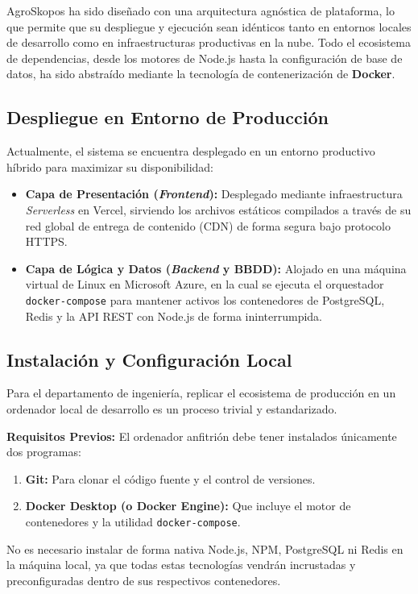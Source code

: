 AgroSkopos ha sido diseñado con una arquitectura agnóstica de plataforma, lo que permite que su despliegue y ejecución sean idénticos tanto en entornos locales de desarrollo como en infraestructuras productivas en la nube. Todo el ecosistema de dependencias, desde los motores de Node.js hasta la configuración de base de datos, ha sido abstraído mediante la tecnología de contenerización de \textbf{Docker}.

\subsection{Despliegue en Entorno de Producción}
Actualmente, el sistema se encuentra desplegado en un entorno productivo híbrido para maximizar su disponibilidad:
\begin{itemize}
    \item \textbf{Capa de Presentación (\textit{Frontend}):} Desplegado mediante infraestructura \textit{Serverless} en Vercel, sirviendo los archivos estáticos compilados a través de su red global de entrega de contenido (CDN) de forma segura bajo protocolo HTTPS.
    \item \textbf{Capa de Lógica y Datos (\textit{Backend} y BBDD):} Alojado en una máquina virtual de Linux en Microsoft Azure, en la cual se ejecuta el orquestador \texttt{docker-compose} para mantener activos los contenedores de PostgreSQL, Redis y la API REST con Node.js de forma ininterrumpida.
\end{itemize}

\subsection{Instalación y Configuración Local}
Para el departamento de ingeniería, replicar el ecosistema de producción en un ordenador local de desarrollo es un proceso trivial y estandarizado.

\textbf{Requisitos Previos:}
El ordenador anfitrión debe tener instalados únicamente dos programas:
\begin{enumerate}
    \item \textbf{Git:} Para clonar el código fuente y el control de versiones.
    \item \textbf{Docker Desktop (o Docker Engine):} Que incluye el motor de contenedores y la utilidad \texttt{docker-compose}.
\end{enumerate}
No es necesario instalar de forma nativa Node.js, NPM, PostgreSQL ni Redis en la máquina local, ya que todas estas tecnologías vendrán incrustadas y preconfiguradas dentro de sus respectivos contenedores.

